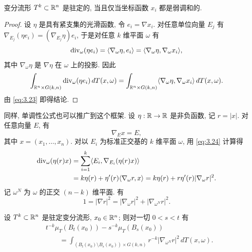 \begin{proposition}[坐标函数的调和性]
\label{prop:3.6}
变分流形 $T^k\subset\mathbb{R}^n$ 是驻定的, 当且仅当坐标函数 $x_i$ 都是弱调和的.
\end{proposition}

\begin{proof}
设 $\eta$ 是具有紧支集的光滑函数, 令 $e_i=\nabla x_i$. 对任意单位向量
$E_j$ 有 $\nabla_{E_j}(\eta e_i)=(\nabla_{E_j}\eta)e_i$, 于是对任意
$k$ 维平面 $\omega$ 有
\begin{equation}
\operatorname{div}_\omega(\eta e_i)=\langle\nabla_\omega\eta,e_i\rangle
 =\langle\nabla_\omega\eta,\nabla_\omega x_i\rangle,
\label{eq:3.22}
\end{equation}
其中 $\nabla_\omega\eta$ 是 $\nabla\eta$ 在 $\omega$ 上的投影. 因此
\begin{equation}
\int_{\mathbb{R}^n\times G(k,n)}\operatorname{div}_\omega(\eta e_i)\,dT(x,\omega)
 =\int_{\mathbb{R}^n\times G(k,n)}
 \langle\nabla_\omega\eta,\nabla_\omega x_i\rangle\,dT(x,\omega).
\label{eq:3.23}
\end{equation}
由 \eqref{eq:3.23} 即得结论.
\end{proof}

同样, 单调性公式也可以推广到这个框架. 设 $\eta:\mathbb{R}\to\mathbb{R}$ 是非负函数, 记
$r=|x|$. 对任意向量 $E$, 有
\begin{equation}
\nabla_E x=E,
\label{eq:3.24}
\end{equation}
其中 $x=(x_1,\dots,x_n)$. 对以 $E_i$ 为标准正交基的 $k$ 维平面 $\omega$,
用 \eqref{eq:3.24} 计算得
\begin{equation}
\begin{aligned}
\operatorname{div}_\omega(\eta(r)x)
&=\sum_{i=1}^k\langle E_i,\nabla_{E_i}(\eta(r)x)\rangle\\
&=k\eta(r)+\eta'(r)\langle\nabla_\omega r,x\rangle
 =k\eta(r)+r\eta'(r)|\nabla_\omega r|^2.
\end{aligned}
\label{eq:3.25}
\end{equation}
记 $\omega^N$ 为 $\omega$ 的正交 $(n-k)$ 维平面. 有
\begin{equation}
1=|\nabla r|^2=|\nabla_\omega r|^2+|\nabla_{\omega^N}r|^2.
\label{eq:3.26}
\end{equation}

\begin{proposition}[驻定变分流形的单调性]
\label{prop:3.7}
设 $T^k\subset\mathbb{R}^n$ 是驻定变分流形, $x_0\in\mathbb{R}^n$; 则对一切 $0<s<t$ 有
\begin{equation}
\begin{aligned}
&t^{-k}\mu_T(B_t(x_0))-s^{-k}\mu_T(B_s(x_0))\\
&\qquad=\int_{(B_t(x_0)\setminus B_s(x_0))\times G(k,n)}
 r^{-k}|\nabla_{\omega^N}r|^2\,dT(x,\omega).
\end{aligned}
\label{eq:3.27}
\end{equation}
\end{proposition}

